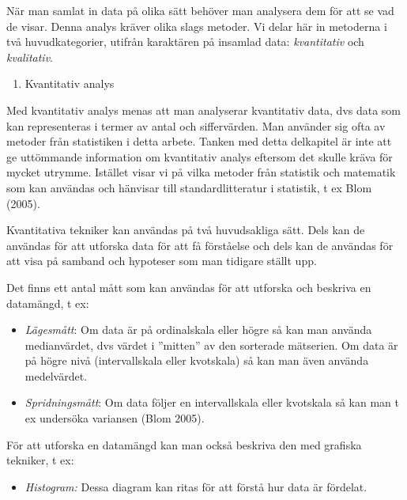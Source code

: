 När man samlat in data på olika sätt behöver man analysera dem för att
se vad de visar. Denna analys kräver olika slags metoder. Vi delar här
in metoderna i två huvudkategorier, utifrån karaktären på insamlad data:
\emph{kvantitativ} och \emph{kvalitativ}.

\begin{enumerate}
\def\labelenumi{\arabic{enumi}.}
\item
  Kvantitativ analys
\end{enumerate}

Med kvantitativ analys menas att man analyserar kvantitativ data, dvs
data som kan representeras i termer av antal och siffervärden. Man
använder sig ofta av metoder från statistiken i detta arbete. Tanken med
detta delkapitel är inte att ge uttömmande information om kvantitativ
analys eftersom det skulle kräva för mycket utrymme. Istället visar vi
på vilka metoder från statistik och matematik som kan användas och
hänvisar till standardlitteratur i statistik, t ex Blom (2005).

Kvantitativa tekniker kan användas på två huvudsakliga sätt. Dels kan de
användas för att utforska data för att få förståelse och dels kan de
användas för att visa på samband och hypoteser som man tidigare ställt
upp.

Det finns ett antal mått som kan användas för att utforska och beskriva
en datamängd, t ex:

\begin{itemize}
\item
  \emph{Lägesmått}: Om data är på ordinalskala eller högre så kan man
  använda medianvärdet, dvs värdet i ''mitten'' av den sorterade
  mätserien. Om data är på högre nivå (intervallskala eller kvotskala)
  så kan man även använda medelvärdet.
\item
  \emph{Spridningsmått}: Om data följer en intervallskala eller
  kvotskala så kan man t ex undersöka variansen (Blom 2005).
\end{itemize}

För att utforska en datamängd kan man också beskriva den med grafiska
tekniker, t ex:

\begin{itemize}
\item
  \emph{Histogram:} Dessa diagram kan ritas för att förstå hur data är
  fördelat.
\end{itemize}

